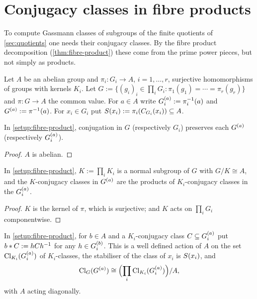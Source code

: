 \section{Conjugacy classes in fibre products}\label{sec:conjugacy}

To compute Gassmann classes of subgroups of the finite quotients of
\cref{sec:quotients} one needs their conjugacy classes. By the fibre
product decomposition (\cref{thm:fibre-product}) these come from the
prime power pieces, but not simply as products.

\begin{setup}\label{setup:fibre-product}
Let $A$ be an abelian group and $\pi_i \colon G_i \to A$, $i = 1, \ldots, r$,
surjective homomorphisms of groups with kernels $K_i$. Let
$G := \{(g_i)_i \in \prod_i G_i : \pi_1(g_1) = \cdots = \pi_r(g_r)\}$ and
$\pi \colon G \to A$ the common value. For $a \in A$ write
$G_i^{(a)} := \pi_i^{-1}(a)$ and $G^{(a)} := \pi^{-1}(a)$. For
$x_i \in G_i$ put $S(x_i) := \pi_i(C_{G_i}(x_i))
\subseteq A$.
\end{setup}

\begin{lemma}\label{lem:types-invariant}
In \cref{setup:fibre-product}, conjugation in $G$ (respectively $G_i$)
preserves each $G^{(a)}$ (respectively $G_i^{(a)}$).
\end{lemma}

\begin{proof}
$A$ is abelian.
\end{proof}

\begin{lemma}
\label{lem:kernel-componentwise}
In \cref{setup:fibre-product}, $K := \prod_i K_i$ is a normal subgroup of
$G$ with $G/K \cong A$, and the $K$-conjugacy classes in $G^{(a)}$ are
the products of $K_i$-conjugacy classes in the $G_i^{(a)}$.
\end{lemma}

\begin{proof}
$K$ is the kernel of $\pi$, which is surjective; and $K$ acts on
$\prod_i G_i$ componentwise.
\end{proof}

\begin{lemma}\label{lem:diagonal-action}
In \cref{setup:fibre-product}, for $b \in A$ and a $K_i$-conjugacy class
$C \subseteq G_i^{(a)}$ put $b\ast C := hCh^{-1}$ for any
$h \in G_i^{(b)}$. This is a well defined action of $A$ on the set
$\mathrm{Cl}_{K_i}(G_i^{(a)})$ of $K_i$-classes, the stabiliser of
the class of $x_i$ is $S(x_i)$, and
\[
  \mathrm{Cl}_{G}(G^{(a)}) \cong
  \Bigl(\prod_i \mathrm{Cl}_{K_i}(G_i^{(a)})\Bigr)/A,
\]
with $A$ acting diagonally.
\end{lemma}

